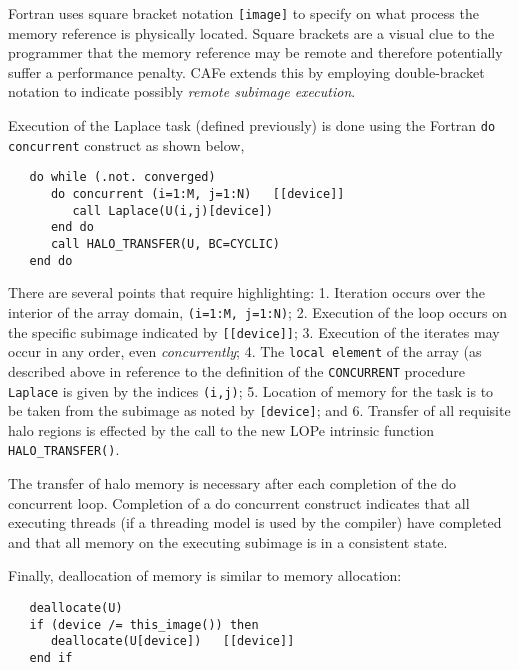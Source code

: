 Fortran uses square bracket notation \texttt{[image]} to specify on what process the
memory reference is physically located.  Square brackets are a visual clue to the
programmer that the memory reference may be remote and therefore potentially suffer a
performance penalty.  CAFe extends this by employing double-bracket notation to indicate
possibly \emph{remote subimage execution}.

Execution of the Laplace task (defined previously) is done using the Fortran \texttt{do
concurrent} construct as shown below,
\begin{verbatim}
   do while (.not. converged)
      do concurrent (i=1:M, j=1:N)   [[device]]
         call Laplace(U(i,j)[device])
      end do
      call HALO_TRANSFER(U, BC=CYCLIC)
   end do
\end{verbatim}
There are several points that require highlighting: 1. Iteration occurs over the interior
of the array domain, \texttt{(i=1:M, j=1:N)}; 2. Execution of the loop occurs on the
specific subimage indicated by \texttt{[[device]]}; 3. Execution of the iterates may occur
in any order, even \emph{concurrently}; 4. The \texttt{local element} of the array (as
described above in reference to the definition of the \texttt{CONCURRENT} procedure
\texttt{Laplace} is given by the indices \texttt{(i,j)}; 5. Location of memory for the
task is to be taken from the subimage as noted by \texttt{[device]}; and 6. Transfer of
all requisite halo regions is effected by the call to the new LOPe intrinsic function
\texttt{HALO\_TRANSFER()}.

The transfer of halo memory is necessary after each completion of the do concurrent loop.
Completion of a do concurrent construct indicates that all executing threads (if a threading
model is used by the compiler) have completed and that all memory on the executing subimage is
in a consistent state.

Finally, deallocation of memory is similar to memory allocation:
\begin{verbatim}
   deallocate(U)
   if (device /= this_image()) then
      deallocate(U[device])   [[device]]
   end if
\end{verbatim}




